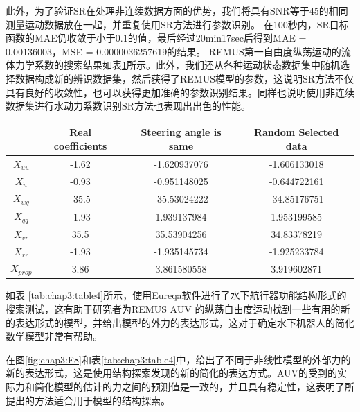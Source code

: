 此外，为了验证SR在处理非连续数据方面的优势，我们将具有SNR等于45的相同测量运动数据放在一起，并重复使用SR方法进行参数识别。 在100秒内，SR目标函数的MAE仍收敛于小于0.1的值，最后经过20min17sec后得到MAE = 0.00136003，MSE = 0.0000036257619的结果。 REMUS第一自由度纵荡运动的流体力学系数的搜索结果如表\ref{tab:chap3:table3}所示。此外，我们还从各种运动状态数据集中随机选择数据构成新的辨识数据集，然后获得了REMUS模型的参数，这说明SR方法不仅 具有良好的收敛性，也可以获得更加准确的参数识别结果。同样也说明使用非连续数据集进行水动力系数识别SR方法也表现出出色的性能。

\begin{table}
\centering
\label{tab:chap3:table3}
\begin{tabular}{cccc}
\toprule
             &Real coefficients & Steering angle is same & Random Selected data\\
\midrule
 $X_{uu}$    & -1.62 &-1.620937076   & -1.606133018 \\
 $X_{\dot u} $   &-0.93  &-0.951148025   & -0.644722161 \\
 $X_{wq}$    &-35.5  & -35.53024222  & -34.85176751  \\
 $X_{qq}$    &-1.93  &  1.939137984  &1.953199585   \\
 $X_{vr}$    &35.5   & 35.53904256   &34.83378219  \\
 $X_{rr}$    &-1.93  &  -1.935145734 &-1.925233784  \\
 $X_{prop}$    &3.86   & 3.861580558   &3.919602871  \\
\bottomrule
\end{tabular}
\end{table}

如表 \ref{tab:chap3:table4}所示，使用Eureqa软件进行了水下航行器功能结构形式的搜索测试，这有助于研究者为REMUS AUV 的纵荡自由度运动找到一些有用的新的表达形式的模型，并给出模型的外力的表达形式，这对于确定水下机器人的简化数学模型非常有帮助。

在图\ref{fig:chap3:F8}和表\ref{tab:chap3:table4}中，给出了不同于非线性模型的外部力的新的表达形式，这是使用结构探索发现的新的简化的表达方式。AUV的受到的实际力和简化模型的估计的力之间的预测值是一致的，并且具有稳定性，这表明了所提出的方法适合用于模型的结构探索。

